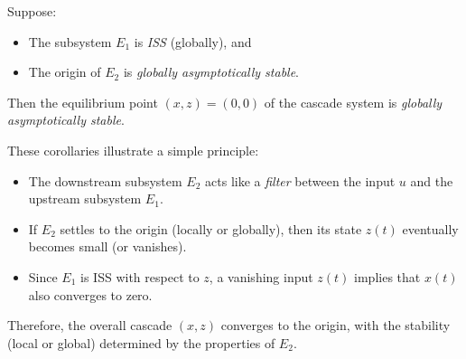 \begin{corollary}
Suppose:
\begin{itemize}
    \item The subsystem $E_1$ is \emph{ISS} (globally), and
    \item The origin of $E_2$ is \emph{globally asymptotically stable}.
\end{itemize}
Then the equilibrium point $(x,z)=(0,0)$ of the cascade system is 
\emph{globally asymptotically stable}.
\end{corollary}

\begin{remark}
These corollaries illustrate a simple principle:
\begin{itemize}
    \item The downstream subsystem $E_2$ acts like a \emph{filter} between the input $u$ 
    and the upstream subsystem $E_1$.
    \item If $E_2$ settles to the origin (locally or globally), then its state $z(t)$ 
    eventually becomes small (or vanishes).
    \item Since $E_1$ is ISS with respect to $z$, a vanishing input $z(t)$ implies that $x(t)$ 
    also converges to zero.
\end{itemize}
Therefore, the overall cascade $(x,z)$ converges to the origin, with the stability 
(local or global) determined by the properties of $E_2$.
\end{remark}



